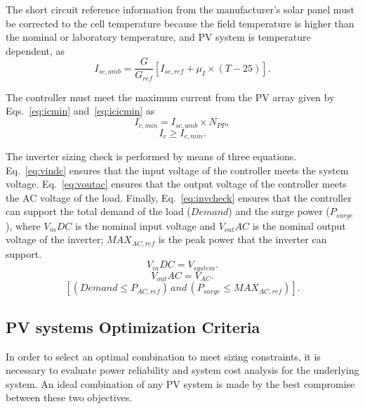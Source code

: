 The short circuit reference information from the manufacturer's solar panel must be corrected 
to the cell temperature because the field temperature is higher than the nominal or laboratory temperature, 
and PV system is temperature dependent, as 
%
\begin{equation}
\label{eq:iscamb}
I_{sc,amb} = \dfrac{G}{G_{ref}} \left[ I_{sc,ref} + \mu_{I} \times (T-25) \right]. 
\end{equation}

The controller must meet the maximum current from the PV array given by Eqs.~\eqref{eq:icmin} and~\eqref{eq:icicmin} as
%
\begin{equation}
\label{eq:icmin}
I_{c,min} = I_{sc,amb} \times N_{PP},
\end{equation}
%
\begin{equation}
\label{eq:icicmin}
I_{c} \geq I_{c,min}.
\end{equation}

The inverter sizing check is performed by means of three equations. Eq.~\eqref{eq:vindc} ensures that 
the input voltage of the controller meets the system voltage. Eq.~\eqref{eq:voutac} ensures that the 
output voltage of the controller meets the AC voltage of the load. Finally, Eq.~\eqref{eq:invcheck} ensures that 
the controller can support the total demand of the load ($Demand$) and the surge power ($P_{surge}$), 
where $V_{in}DC$ is the nominal input voltage and $V_{out}AC$ is the nominal output voltage of the inverter; 
$MAX_{AC,ref}$ is the peak power that the inverter can support.
%
\begin{equation}
\label{eq:vindc} 
V_{in}DC = V_{system}.
\end{equation}
%
\begin{equation}
\label{eq:voutac} 
V_{out}AC = V_{AC}.
\end{equation}
%
\begin{equation}
\label{eq:invcheck} 
\left[ (Demand \leq P_{AC,ref}) \, and \, (P_{surge} \leq MAX_{AC,ref}) \right].
\end{equation}

\subsection{PV systems Optimization Criteria}

In order to select an optimal combination to meet sizing constraints, 
it is necessary to evaluate power reliability and system cost analysis for the underlying system. An ideal combination of any PV system is made by the best compromise between these two objectives.

